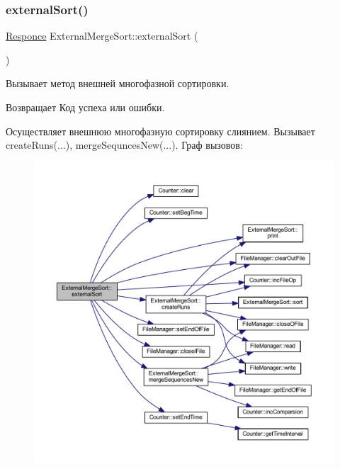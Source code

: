 \subsubsection{\texorpdfstring{external\+Sort()}{externalSort()}}
{\footnotesize\ttfamily \hyperlink{_structures_8h_a9864d6ef28dd6e38416afac4426b3491}{Responce} External\+Merge\+Sort\+::external\+Sort (\begin{DoxyParamCaption}{ }\end{DoxyParamCaption})}



Вызывает метод внешней многофазной сортировки. 

\begin{DoxyReturn}{Возвращает}
Код успеха или ошибки.
\end{DoxyReturn}
Осуществляет внешнюю многофазную сортировку слиянием. Вызывает create\+Runs(...), merge\+Sequnces\+New(...). Граф вызовов\+:\nopagebreak
\begin{figure}[H]
\begin{center}
\leavevmode
\includegraphics[width=350pt]{class_external_merge_sort_aa0d80e41effe3a13c0d63b33e208918f_cgraph}
\end{center}
\end{figure}
\hypertarget{class_external_merge_sort_a8b4f951d9ee53818b8d3d4e84e2a1aa4}{}\label{class_external_merge_sort_a8b4f951d9ee53818b8d3d4e84e2a1aa4} 
